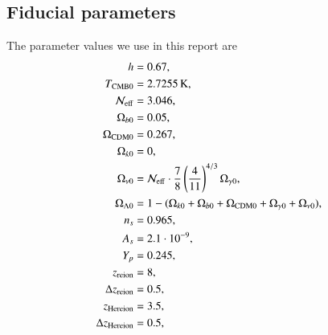 \documentclass{aa}
\begin{document}
\clearpage
% 

% 

% 

\begin{appendix}
\section{Fiducial parameters} \label{app:M1:fiducial_parameters}
The parameter values we use in this report are 
\begin{equation} \label{eq:Appendix:Fiducial_cosmology_parameters}
      \begin{split}
            h &= 0.67, \\ 
            T_\mathrm{CMB0} &= 2.7255\,\mathrm{K}, \\
            \mathcal{N}_\mathrm{eff} &= 3.046, \\
            \Omega_{b0} &= 0.05, \\
            \Omega_\mathrm{CDM0} &= 0.267,\\
            \Omega_{k0} &=0,\\
            \Omega_{\nu 0} &= \mathcal{N}_\mathrm{eff} \cdot \frac{7}{8} \left( \frac{4}{11} \right)^{4/3} \Omega_{\gamma 0}, \\
            \Omega_{\Lambda 0} &= 1 - (\Omega_{k0} + \Omega_{b0} + \Omega_\mathrm{CDM0} + \Omega_{\gamma 0} + \Omega_{\nu 0}), \\
            n_s &= 0.965,\\
            A_s &= 2.1\cdot 10^{-9},\\
            Y_p &= 0.245, \\
            z_\mathrm{reion} &= 8, \\
            \Delta z_\mathrm{reion} &= 0.5, \\
            z_\mathrm{Hereion} &= 3.5, \\
            \Delta z_\mathrm{Hereion} &= 0.5, \\
      \end{split}
\end{equation}


\end{appendix}
\end{document}
